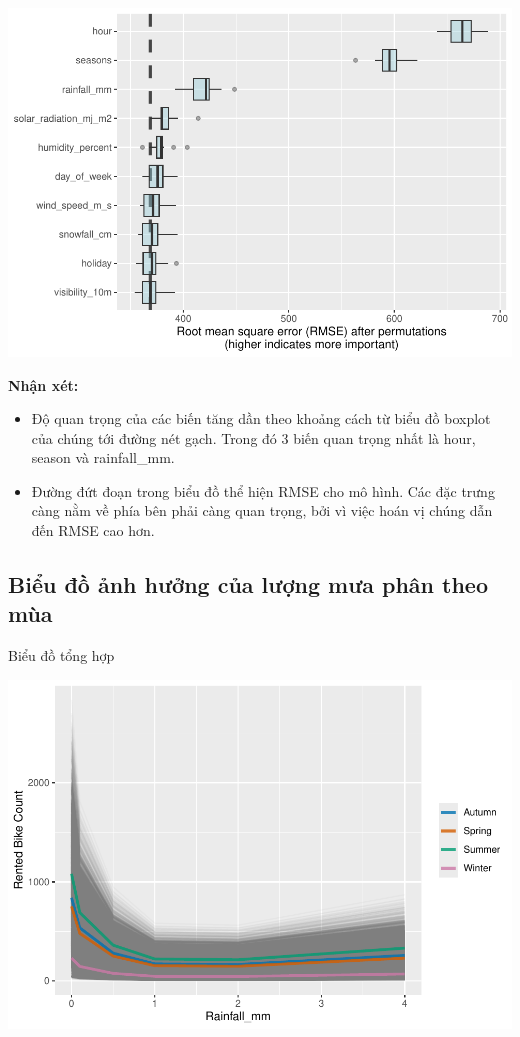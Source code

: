 \documentclass[
  11pt,
  letterpaper,
]{article}
\begin{document}
\begin{center}\includegraphics[width=1.2\linewidth,]{Final_Project_files/figure-latex/unnamed-chunk-50-1} \end{center}

\textbf{Nhận xét:}

\begin{itemize}
\item Độ quan trọng của các biến tăng dần theo khoảng cách từ biểu đồ boxplot của chúng tới đường nét gạch. Trong đó 3 biến quan trọng nhất là hour, season và rainfall\_mm.
\item Đường đứt đoạn trong biểu đồ thể hiện RMSE cho mô hình. Các đặc trưng càng nằm về phía bên phải càng quan trọng, bởi vì việc hoán vị chúng dẫn đến RMSE cao hơn.
\end{itemize}

\subsection{Biểu đồ ảnh hưởng của lượng mưa phân theo mùa}

Biểu đồ tổng hợp

\begin{center}\includegraphics[width=1.2\linewidth,]{Final_Project_files/figure-latex/unnamed-chunk-51-1} \end{center}
\end{document}
